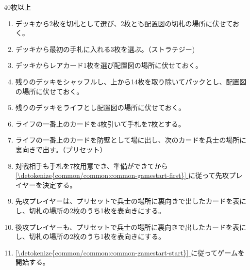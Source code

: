 \documentclass[letterpaper,10pt,dvipdfmx]{sphinxmanual}
\begin{document}
\sphinxAtStartPar
{}

\sphinxAtStartPar
40枚以上

\sphinxAtStartPar
{}
\begin{enumerate}
%
\item {} 
\sphinxAtStartPar
デッキから2枚を切札として選び、2枚とも配置図の切札の場所に伏せておく。

\item {} 
\sphinxAtStartPar
デッキから最初の手札に入れる3枚を選ぶ。（ストラテジー)

\item {} 
\sphinxAtStartPar
デッキからレアカード1枚を選び配置図の場所に伏せておく。

\item {} 
\sphinxAtStartPar
残りのデッキをシャッフルし、上から14枚を取り除いてパックとし、配置図の場所に伏せておく。

\item {} 
\sphinxAtStartPar
残りのデッキをライフとし配置図の場所に伏せておく。

\item {} 
\sphinxAtStartPar
ライフの一番上のカードを4枚引いて手札を7枚とする。

\item {} 
\sphinxAtStartPar
ライフの一番上のカードを防壁として場に出し、次のカードを兵士の場所に裏向きで出す。（プリセット）

\item {} 
\sphinxAtStartPar
対戦相手も手札を7枚用意でき、準備ができてから \hyperref[\detokenize{common/common:common-gamestart-first}]{\ref{\detokenize{common/common:common-gamestart-first}} } に従って先攻プレイヤーを決定する。

\item {} 
\sphinxAtStartPar
先攻プレイヤーは、プリセットで兵士の場所に裏向きで出したカードを表にし、切札の場所の2枚のうち1枚を表向きにする。

\item {} 
\sphinxAtStartPar
後攻プレイヤーも、プリセットで兵士の場所に裏向きで出したカードを表にし、切札の場所の2枚のうち1枚を表向きにする。

\item {} 
\sphinxAtStartPar
\hyperref[\detokenize{common/common:common-gamestart-start}]{\ref{\detokenize{common/common:common-gamestart-start}} } に従ってゲームを開始する。

\end{enumerate}
\end{document}
